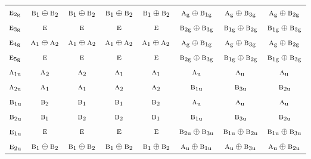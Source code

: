 \documentclass[10pt,a4paper]{article}
\numberwithin{equation}{section}
\newcommand{\irr}[1]{\text{\normalfont\scshape #1}}
\newcommand{\ptag}[1]{\mathrm{#1}}
\begin{document}
{\begin{longtable}{@{}lccccccc@{}}
$\irr{e}_{2\ptag{g}}$ & $\irr{b}_{1}\oplus \irr{b}_{2}$ & $\irr{b}_{1}\oplus \irr{b}_{2}$ & $\irr{b}_{1}\oplus \irr{b}_{2}$ & $\irr{b}_{1}\oplus \irr{b}_{2}$ & $\irr{a}_{\ptag{g}}\oplus \irr{b}_{1\ptag{g}}$ & $\irr{a}_{\ptag{g}}\oplus \irr{b}_{3\ptag{g}}$ & $\irr{a}_{\ptag{g}}\oplus \irr{b}_{2\ptag{g}}$\\
$\irr{e}_{3\ptag{g}}$ & $\irr{e}$ & $\irr{e}$ & $\irr{e}$ & $\irr{e}$ & $\irr{b}_{2\ptag{g}}\oplus \irr{b}_{3\ptag{g}}$ & $\irr{b}_{1\ptag{g}}\oplus \irr{b}_{2\ptag{g}}$ & $\irr{b}_{1\ptag{g}}\oplus \irr{b}_{3\ptag{g}}$\\
$\irr{e}_{4\ptag{g}}$ & $\irr{a}_{1}\oplus \irr{a}_{2}$ & $\irr{a}_{1}\oplus \irr{a}_{2}$ & $\irr{a}_{1}\oplus \irr{a}_{2}$ & $\irr{a}_{1}\oplus \irr{a}_{2}$ & $\irr{a}_{\ptag{g}}\oplus \irr{b}_{1\ptag{g}}$ & $\irr{a}_{\ptag{g}}\oplus \irr{b}_{3\ptag{g}}$ & $\irr{a}_{\ptag{g}}\oplus \irr{b}_{2\ptag{g}}$\\
$\irr{e}_{5\ptag{g}}$ & $\irr{e}$ & $\irr{e}$ & $\irr{e}$ & $\irr{e}$ & $\irr{b}_{2\ptag{g}}\oplus \irr{b}_{3\ptag{g}}$ & $\irr{b}_{1\ptag{g}}\oplus \irr{b}_{2\ptag{g}}$ & $\irr{b}_{1\ptag{g}}\oplus \irr{b}_{3\ptag{g}}$\\
$\irr{a}_{1\ptag{u}}$ & $\irr{a}_{2}$ & $\irr{a}_{2}$ & $\irr{a}_{1}$ & $\irr{a}_{1}$ & $\irr{a}_{\ptag{u}}$ & $\irr{a}_{\ptag{u}}$ & $\irr{a}_{\ptag{u}}$\\
$\irr{a}_{2\ptag{u}}$ & $\irr{a}_{1}$ & $\irr{a}_{1}$ & $\irr{a}_{2}$ & $\irr{a}_{2}$ & $\irr{b}_{1\ptag{u}}$ & $\irr{b}_{3\ptag{u}}$ & $\irr{b}_{2\ptag{u}}$\\
$\irr{b}_{1\ptag{u}}$ & $\irr{b}_{2}$ & $\irr{b}_{1}$ & $\irr{b}_{1}$ & $\irr{b}_{2}$ & $\irr{a}_{\ptag{u}}$ & $\irr{a}_{\ptag{u}}$ & $\irr{a}_{\ptag{u}}$\\
$\irr{b}_{2\ptag{u}}$ & $\irr{b}_{1}$ & $\irr{b}_{2}$ & $\irr{b}_{2}$ & $\irr{b}_{1}$ & $\irr{b}_{1\ptag{u}}$ & $\irr{b}_{3\ptag{u}}$ & $\irr{b}_{2\ptag{u}}$\\
$\irr{e}_{1\ptag{u}}$ & $\irr{e}$ & $\irr{e}$ & $\irr{e}$ & $\irr{e}$ & $\irr{b}_{2\ptag{u}}\oplus \irr{b}_{3\ptag{u}}$ & $\irr{b}_{1\ptag{u}}\oplus \irr{b}_{2\ptag{u}}$ & $\irr{b}_{1\ptag{u}}\oplus \irr{b}_{3\ptag{u}}$\\
$\irr{e}_{2\ptag{u}}$ & $\irr{b}_{1}\oplus \irr{b}_{2}$ & $\irr{b}_{1}\oplus \irr{b}_{2}$ & $\irr{b}_{1}\oplus \irr{b}_{2}$ & $\irr{b}_{1}\oplus \irr{b}_{2}$ & $\irr{a}_{\ptag{u}}\oplus \irr{b}_{1\ptag{u}}$ & $\irr{a}_{\ptag{u}}\oplus \irr{b}_{3\ptag{u}}$ & $\irr{a}_{\ptag{u}}\oplus \irr{b}_{2\ptag{u}}$\\

\end{longtable}}
\end{document}
